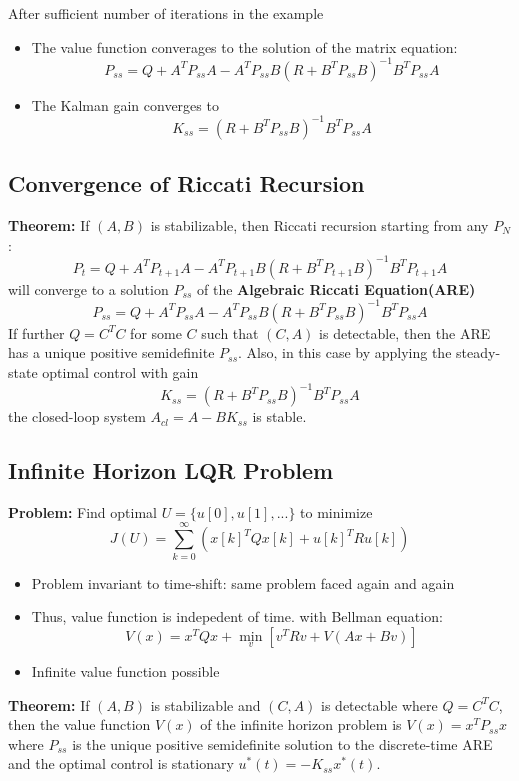 \documentclass[10pt,a4paper,oneside]{article}
\begin{document}
\noindent After sufficient number of iterations in the example
\begin{itemize}
\item The value function converages to the solution of the matrix equation:
\[
P_{ss}=Q+A^TP_{ss}A - A^TP_{ss}B(R+B^TP_{ss}B)^{-1}B^TP_{ss}A
\]
\item The Kalman gain converges to
\[
K_{ss} =(R+B^TP_{ss}B)^{-1}B^TP_{ss}A
\]
\end{itemize}
\subsection{Convergence of Riccati Recursion}
{\bfseries Theorem: }If $(A,B)$ is stabilizable, then Riccati recursion starting from any $P_N$:
\[
P_t=Q+A^TP_{t+1}A - A^TP_{t+1}B(R+B^TP_{t+1}B)^{-1}B^TP_{t+1}A
\]
will converge to a solution $P_{ss}$ of the {\bfseries Algebraic Riccati Equation(ARE)}
\[
P_{ss}=Q+A^TP_{ss}A - A^TP_{ss}B(R+B^TP_{ss}B)^{-1}B^TP_{ss}A
\]
If further $Q=C^TC$ for some $C$ such that $(C,A)$ is detectable, then the ARE has a unique positive semidefinite $P_{ss}$. Also, in this case by applying the steady-state optimal control with gain
\[
K_{ss}=(R+B^TP_{ss}B)^{-1}B^TP_{ss}A
\]
the closed-loop system $A_{cl}=A-BK_{ss}$ is stable.
\subsection{Infinite Horizon LQR Problem}
{\bfseries Problem: }Find optimal $U=\{u[0],u[1],...\}$ to minimize
$$
J(U)=\sum_{k=0}^{\infty}\left(x[k]^{T} Q x[k]+u[k]^{T} R u[k]\right)
$$
\begin{itemize}
\item Problem invariant to time-shift: same problem faced again and again
\item Thus, value function is indepedent of time. with Bellman equation:
$$
V(x)=x^{T} Q x+\min _{v}\left[v^{T} R v+V(A x+B v)\right]
$$
\item Infinite value function possible
\end{itemize}
{\bfseries Theorem: }If $(A,B)$ is stabilizable and $(C,A)$ is detectable where $Q=C^TC$, then the value function $V(x)$ of the infinite horizon problem is $V(x)=x^TP_{ss}x$ where $P_{ss}$ is the unique positive semidefinite solution to the discrete-time ARE and the optimal control is stationary $u^*(t)=-K_{ss}x^*(t)$.
\end{document}
